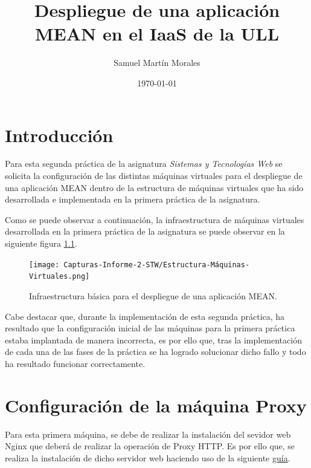 \documentclass{report}
\begin{document}
	
	
	\title{Despliegue de una aplicación MEAN en el IaaS de la ULL}
	\author{Samuel Martín Morales}
	\date{\today}
	
	\maketitle
	
	\tableofcontents
	
	\chapter{Introducción}
  Para esta segunda práctica de la asignatura \emph{Sistemas y Tecnologías Web} se solicita la configuración de las distintas máquinas virtuales para el despliegue de una aplicación MEAN dentro de la estructura de máquinas virtuales que ha sido desarrollada e implementada en la primera práctica de la asignatura.

  Como se puede observar a continuación, la infraestructura de máquinas virtuales desarrollada en la primera práctica de la asignatura se puede observar en la siguiente figura \ref{fig:Estrcutura-Máquinas-Virtuales}. 
	
	\begin{figure}[H]
		\centering
		\texttt{[image: Capturas-Informe-2-STW/Estructura-Máquinas-Virtuales.png]}
		\caption{Infraestructura básica para el despliegue de una aplicación MEAN.}
		\label{fig:Estrcutura-Máquinas-Virtuales}
	\end{figure}

  Cabe destacar que, durante la implementación de esta segunda práctica, ha resultado que la configuración inicial de las máquinas para la primera práctica estaba implantada de manera incorrecta, es por ello que, tras la implementación de cada una de las fases de la práctica se ha logrado solucionar dicho fallo y todo ha resultado funcionar correctamente.
	
	\chapter{Configuración de la máquina Proxy}
	Para esta primera máquina, se debe de realizar la instalación del sevidor web Nginx que deberá de realizar la operación de Proxy HTTP. Es por ello que, se realiza la instalación de dicho servidor web haciendo uso de la siguiente \href{https://linuxize.com/post/how-to-install-nginx-on-debian-9/}{guía}.
\end{document}
